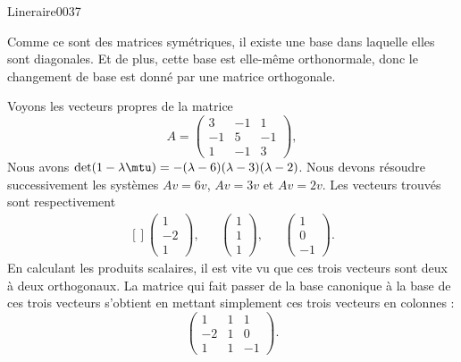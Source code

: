 \begin{corrige}{Lineraire0037}

	Comme ce sont des matrices symétriques, il existe une base dans laquelle elles sont diagonales. Et de plus, cette base est elle-même orthonormale, donc le changement de base est donné par une matrice orthogonale.

	Voyons les vecteurs propres de la matrice
	\begin{equation}
		A=\begin{pmatrix}
			3	&	-1	&	1	\\
			-1	&	5	&	-1	\\
			1	&	-1	&	3
		\end{pmatrix},
	\end{equation}
	Nous avons $\det(1-\lambda\mtu)=-(\lambda-6)(\lambda-3)(\lambda-2)$. Nous devons résoudre successivement les systèmes $Av=6v$, $Av=3v$ et $Av=2v$. Les vecteurs trouvés sont respectivement
	\begin{equation}
		\begin{aligned}[]
			\begin{pmatrix}
				1	\\ 
				-2	\\ 
				1	
			\end{pmatrix},
			&&\begin{pmatrix}
				1	\\ 
				1	\\ 
				1	
			\end{pmatrix},&&\begin{pmatrix}
				1	\\ 
				0	\\ 
				-1	
			\end{pmatrix}.
		\end{aligned}
	\end{equation}
	En calculant les produits scalaires, il est vite vu que ces trois vecteurs sont deux à deux orthogonaux. La matrice qui fait passer de la base canonique à la base de ces trois vecteurs s'obtient en mettant simplement ces trois vecteurs en colonnes :
	\begin{equation}
		\begin{pmatrix}
			1	&	1	&	1	\\
			-2	&	1	&	0	\\
			1	&	1	&	-1
		\end{pmatrix}.
	\end{equation}

\end{corrige}
